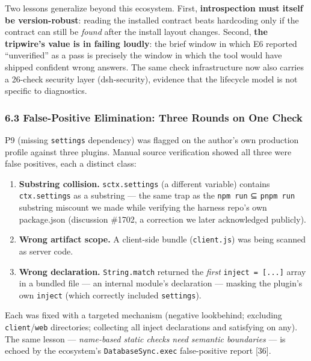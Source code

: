 \documentclass[
]{article}
\providecommand{\tightlist}{%
  \setlength{\itemsep}{0pt}\setlength{\parskip}{0pt}}
\begin{document}
Two lessons generalize beyond this ecosystem. First, \textbf{introspection must
itself be version-robust}: reading the installed contract beats hardcoding only
if the contract can still be \emph{found} after the install layout changes.
Second, \textbf{the tripwire's value is in failing loudly}: the brief window in
which E6 reported ``unverified'' as a pass is precisely the window in which the
tool would have shipped confident wrong answers. The same check infrastructure
now also carries a 26-check security layer (dsh-security), evidence that the
lifecycle model is not specific to diagnostics.

\subsubsection{6.3 False-Positive Elimination: Three Rounds on One
Check}\label{false-positive-elimination-three-rounds-on-one-check}

P9 (missing \texttt{settings} dependency) was flagged on the author's
own production profile against three plugins. Manual source verification
showed all three were false positives, each a distinct class:

\begin{enumerate}
\def\labelenumi{\arabic{enumi}.}
\tightlist
\item
  \textbf{Substring collision.} \texttt{sctx.settings} (a different
  variable) contains \texttt{ctx.settings} as a substring --- the same
  trap as the \texttt{npm\ run} ⊆ \texttt{pnpm\ run} substring miscount
  we made while verifying the harness repo's own package.json
  (discussion \#1702, a correction we later acknowledged publicly).
\item
  \textbf{Wrong artifact scope.} A client-side bundle
  (\texttt{client.js}) was being scanned as server code.
\item
  \textbf{Wrong declaration.} \texttt{String.match} returned the
  \emph{first} \texttt{inject\ =\ {[}...{]}} array in a bundled file ---
  an internal module's declaration --- masking the plugin's own
  \texttt{inject} (which correctly included \texttt{settings}).
\end{enumerate}

Each was fixed with a targeted mechanism (negative lookbehind; excluding
\texttt{client}/\texttt{web} directories; collecting all inject
declarations and satisfying on any). The same lesson ---
\emph{name-based static checks need semantic boundaries} --- is echoed
by the ecosystem's \texttt{DatabaseSync.exec} false-positive report
{[}36{]}.
\end{document}
